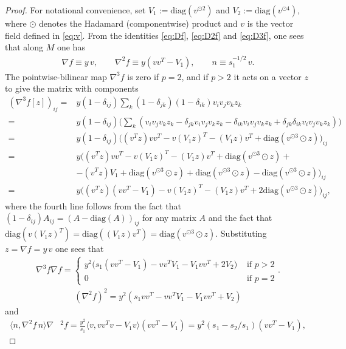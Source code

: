 \documentclass{article}
\theoremstyle{plain}
\theoremstyle{definition}
\theoremstyle{remark}
\begin{document}
\begin{proof}
    For notational convenience, set  $V_1:=\text{diag}(v^{\odot2})$ and $V_2:=\text{diag}(v^{\odot 4})$, where $\odot$ denotes the Hadamard (componentwise) product and $v$ is the vector field defined in \eqref{eq:v}. From the identities \eqref{eq:Df}, \eqref{eq:D2f} and \eqref{eq:D3f}, one sees that along $M$ one has
    \begin{align}
        \nabla f \equiv y\,v,\qquad \nabla ^2f \equiv  y(vv^T - V_1),\qquad n \equiv s_1^{-1/2}\,v.
    \end{align}
    The pointwise-bilinear map $\nabla^3f$ is zero if $p=2$, and if $p>2$ it acts on a vector $z$ to give the matrix with components
    \begin{align}
        (\nabla^3 f[z])_{ij} =&y(1-\delta_{ij})\sum_k(1-\delta_{jk})(1-\delta_{ik})v_iv_jv_kz_k\\=&y(1-\delta_{ij})\big(\sum_k(v_iv_jv_kz_k - \delta_{jk}v_iv_jv_kz_k-\delta_{ik}v_iv_jv_kz_k + \delta_{jk}\delta_{ik}v_iv_jv_kz_k)\big)\\=&y(1-\delta_{ij})\big((v^Tz)vv^T - v(V_1z)^T - (V_1z)v^T + \text{diag}(v^{\odot 3}\odot z)\big)_{ij}\\=&y\big((v^Tz)vv^T-v(V_1z)^T-(V_1z)v^T+\text{diag}(v^{\odot 3}\odot z)+\\&-(v^Tz)V_1 + \text{diag}(v^{\odot 3}\odot z) + \text{diag}(v^{\odot 3}\odot z) - \text{diag}(v^{\odot 3}\odot z)\big)_{ij}\\=&y\big((v^Tz)(vv^T-V_1)-v(V_1z)^T - (V_1z)v^T + 2\text{diag}(v^{\odot 3}\odot z)\big)_{ij},
    \end{align}
    where the fourth line follows from the fact that $(1-\delta_{ij})A_{ij} = (A-\text{diag}(A))_{ij}$ for any matrix $A$ and the fact that $\text{diag}(v(V_1z)^T) = \text{diag}((V_1z)v^T) = \text{diag}(v^{\odot 3}\odot z)$. Substituting $z = \nabla f =  y\,v$ one sees that
    \begin{align}
        \nabla^3f\nabla f = \begin{cases}y^2\big(s_1(vv^T-V_1) - vv^TV_1 - V_1vv^T + 2V_2\big)&\text{ if $p>2$}\\ 0&\text{ if $p=2$}\end{cases}.
    \end{align}
    \begin{align}
        (\nabla^2f)^2 = y^2(s_1vv^T - vv^TV_1-V_1vv^T +V_2)
    \end{align}
    and
    \begin{align}
        \langle n,\nabla^2f\,n\rangle\nabla&^2f = \frac{y^2}{s_1}\langle v,vv^Tv-V_1v\rangle (vv^T-V_1) = y^2(s_1-s_2/s_1)(vv^T-V_1),

\end{align}
\end{proof}
\end{document}

